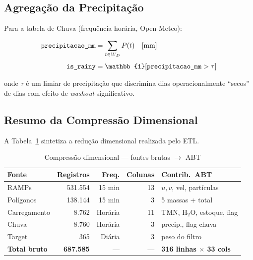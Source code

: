 \documentclass[12pt, a4paper]{article}
\newcommand{\feature}[1]{\texttt{#1}}
\newcommand{\abt}{ABT}
\begin{document}
\subsection{Agregação da Precipitação}
\label{subsec:agreg_chuva}

Para a tabela de Chuva (frequência horária, Open-Meteo):

\begin{equation}
    \begin{aligned}
    \feature{precipitacao\_mm} &= \sum_{t \in W_D}
        P(t) \quad \text{[\si{\milli\metre}]} \\[4pt]
    \feature{is\_rainy} &= \mathbb{1}\!\left[
        \feature{precipitacao\_mm} > \tau\right]
    \end{aligned}
    \label{eq:chuva_agreg}
\end{equation}

onde $\tau$ é um limiar de precipitação que discrimina dias
operacionalmente ``secos'' de dias com efeito de \textit{washout}
significativo.

\subsection{Resumo da Compressão Dimensional}
\label{subsec:compressao}

A Tabela~\ref{tab:compressao} sintetiza a redução dimensional realizada
pelo ETL.

\begin{table}[H]
\centering
\caption{Compressão dimensional — fontes brutas $\to$ \abt{}}
\label{tab:compressao}
\begin{tabular}{@{}lrrrl@{}}
\toprule
\textbf{Fonte} & \textbf{Registros} & \textbf{Freq.} &
    \textbf{Colunas} & \textbf{Contrib.\ \abt{}} \\
\midrule
RAMPs          & 531.554 & 15 min  & 13 & $u, v$, vel, partículas \\
Polígonos      & 138.144 & 15 min  & 3  & 5 massas + total \\
Carregamento   & 8.762   & Horária & 11 & TMN, H$_2$O, estoque, flag \\
Chuva          & 8.760   & Horária & 3  & precip., flag chuva \\
Target         & 365     & Diária  & 3  & peso do filtro \\
\midrule
\textbf{Total bruto} & \textbf{687.585} & --- & --- &
    \textbf{316 linhas $\times$ 33 cols} \\
\bottomrule
\end{tabular}
\end{table}
\end{document}
